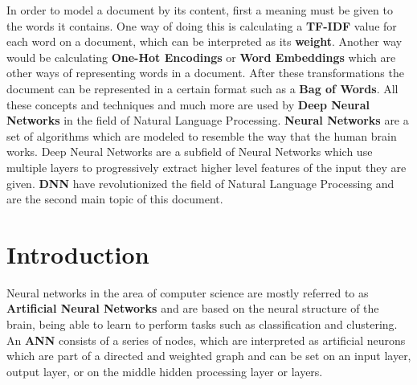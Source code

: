 \documentclass{scrartcl}
\begin{document}
    In order to model a document by its content, first a meaning must be given to the words it
    contains. \newline 
    One way of doing this is calculating a \textbf{TF-IDF} value for each word on a
    document, which can be interpreted as its \textbf{weight}. Another way would be calculating
    \textbf{One-Hot Encodings} or \textbf{Word Embeddings} which are other ways 
    of representing words in a document.
    After these transformations the document can be represented in a certain format
    such as a \textbf{Bag of Words}. \newline 
    All these concepts and techniques and much more are used by \textbf{Deep Neural Networks} in 
    the field of Natural Language Processing. \textbf{Neural Networks} are a set of algorithms 
    which are modeled to resemble the way that the human brain works. Deep Neural Networks
    are a subfield of Neural Networks which use multiple layers to progressively extract 
    higher level features of the input they are given. \textbf{DNN} have revolutionized the field
    of Natural Language Processing and are the second main topic of this document. 
    \newpage
    \section{ Introduction }
    Neural networks in the area of computer science are mostly referred to as 
    \textbf{Artificial Neural Networks} and are based on the neural structure of the brain,
    being able to learn to perform tasks such as classification and clustering. \newline
    An \textbf{ANN} consists of a series of nodes, which are interpreted as artificial neurons 
    which are part of a directed and weighted graph and can be set on an input layer, 
    output layer, or on the middle hidden processing layer or layers.
    
\end{document}
